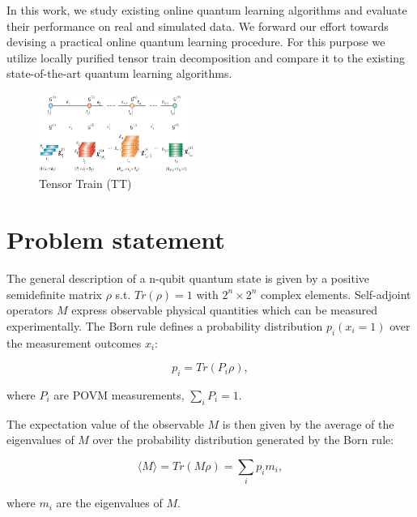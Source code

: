 \documentclass[%
 reprint,
 amsmath,amssymb,
 aps,
]{revtex4-2}
\begin{document}
In this work, we study existing online quantum learning algorithms and evaluate their performance on real and simulated data. We forward our effort towards devising a practical online quantum learning procedure. For this purpose we utilize locally purified tensor train decomposition and compare it to the existing state-of-the-art quantum learning algorithms.

\begin{figure}[ht!]
    \centering
    \includegraphics[width=0.45\textwidth]{img/tensor_train.png}
    \caption{Tensor Train (TT) \cite{tensorTrains, tensorTrainsOs}}
    \label{fig:tensor_trains}
\end{figure}

\section{\label{sec:problem_statement}Problem statement}

The general description of a n-qubit quantum state is given by a positive semidefinite matrix $\rho$ s.t. $Tr(\rho)=1$ with $2^{n}\times 2^{n}$ complex elements. Self-adjoint operators $M$ express observable physical quantities which can be measured experimentally. The Born rule defines a probability distribution $p_i(x_{i}=1)$ over the measurement outcomes $x_{i}$:

\begin{equation}\label{eq::Born_rule}
    p_{i} = Tr(P_{i}\rho),
\end{equation}

where $P_{i}$ are POVM measurements, $\sum_{i}P_{i}=1$. 

The expectation value of the observable $M$ is then given by the average of the eigenvalues of $M$ over the probability distribution generated by the Born rule:

\begin{equation}\label{eq::expectation_value}
    \langle M\rangle = Tr(M\rho) = \sum_{i} p_{i}m_{i},
\end{equation}

where $m_{i}$ are the eigenvalues of $M$. 
\end{document}
